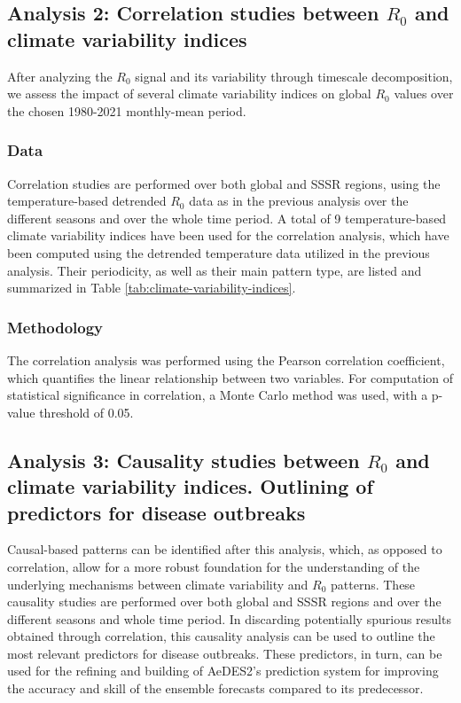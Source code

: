 \documentclass[article,10pt,twocolumn]{wlscirep}
\begin{document}
  \subsection{Analysis 2: Correlation studies between $R_0$ and climate variability indices} \label{sec-methods-2}
  
  After analyzing the $R_0$ signal and its variability through timescale decomposition, we assess the impact of several climate variability indices on global $R_0$ values over the chosen 1980-2021 monthly-mean period.  
  
  \subsubsection{Data} \label{sec-methods-2-data}
  
  Correlation studies are performed over both global and SSSR regions, using the temperature-based detrended $R_0$ data as in the previous analysis over the different seasons and over the whole time period. A total of 9 temperature-based climate variability indices have been used for the correlation analysis, which have been computed using the detrended temperature data utilized in the previous analysis. Their periodicity, as well as their main pattern type, are listed and summarized in Table \ref{tab:climate-variability-indices}.
  
  
  \subsubsection{Methodology} \label{sec-methods-2-methodology}
  
  The correlation analysis was performed using the Pearson correlation coefficient, which quantifies the linear relationship between two variables. For computation of statistical significance in correlation, a Monte Carlo method was used, with a p-value threshold of 0.05.

  \subsection{Analysis 3: Causality studies between $R_0$ and climate variability indices. Outlining of predictors for disease outbreaks} \label{sec-methods-3}
  
  Causal-based patterns can be identified after this analysis, which, as opposed to correlation, allow for a more robust foundation for the understanding of the underlying mechanisms between climate variability and $R_0$ patterns. These causality studies are performed over both global and SSSR regions and over the different seasons and whole time period. In discarding potentially spurious results obtained through correlation, this causality analysis can be used to outline the most relevant predictors for disease outbreaks. These predictors, in turn, can be used for the refining and building of AeDES2's prediction system for improving the accuracy and skill of the ensemble forecasts compared to its predecessor.
  
\end{document}
